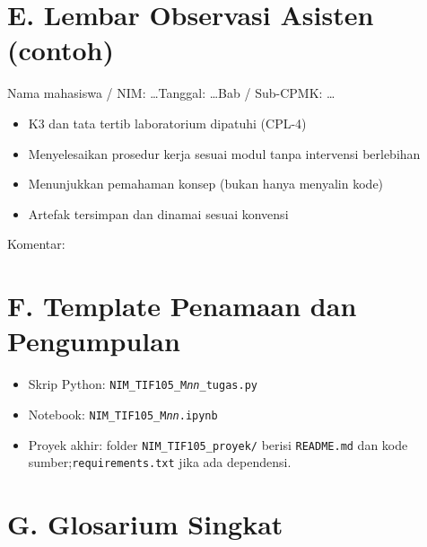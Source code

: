 \section*{E. Lembar Observasi Asisten (contoh)}

Nama mahasiswa / NIM: \ldots\quad Tanggal: \ldots\quad Bab / Sub-CPMK: \ldots

\begin{itemize}[leftmargin=*, label=$\square$]
  \item K3 dan tata tertib laboratorium dipatuhi (CPL-4)
  \item Menyelesaikan prosedur kerja sesuai modul tanpa intervensi berlebihan
  \item Menunjukkan pemahaman konsep (bukan hanya menyalin kode)
  \item Artefak tersimpan dan dinamai sesuai konvensi
\end{itemize}

\noindent Komentar: \hrulefill

\section*{F. Template Penamaan dan Pengumpulan}

\begin{itemize}[leftmargin=*]
  \item Skrip Python: \texttt{NIM\_TIF105\_M\textit{nn}\_tugas.py}
  \item Notebook: \texttt{NIM\_TIF105\_M\textit{nn}.ipynb}
  \item Proyek akhir: folder \texttt{NIM\_TIF105\_proyek/} berisi \texttt{README.md} dan kode sumber;\newline \texttt{requirements.txt} jika ada dependensi.
\end{itemize}

\section*{G. Glosarium Singkat}

